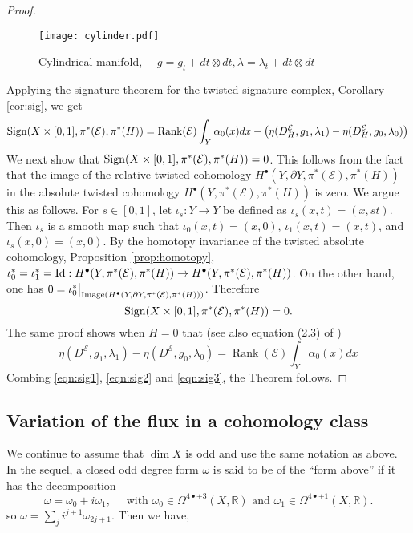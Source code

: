 \documentclass[12pt]{amsart}
\theoremstyle{plain}
\theoremstyle{definition}
\theoremstyle{remark}
\begin{document}
{\begin{proof}
\begin{figure}[h]
\texttt{[image: cylinder.pdf]}\\
\caption{Cylindrical manifold, $\quad g= g_t + dt\otimes dt,  \lambda = \lambda_t + dt\otimes dt$}
\label{fig:box-metric}
\end{figure}

Applying the signature theorem for the twisted signature complex, Corollary \ref{cor:sig}, we get
\begin{equation}\label{eqn:sig1}
{\rm Sign}(X \times [0,1], \pi^*({\mathcal E}), \pi^*(H))={\operatorname{Rank}}({\mathcal E}) \int_Y \alpha_0(x)dx - \left(\eta(D^{\mathcal E}_H, g_1, \lambda_1)
-\eta(D^{\mathcal E}_H, g_0, \lambda_0)\right)\\
\end{equation}
We next {{show}} that ${\rm Sign}(X \times [0,1], \pi^*({\mathcal E}), \pi^*(H))=0$. This follows from the fact that
the image of the relative twisted cohomology $H^\bullet(Y, \partial Y, \pi^*({\mathcal E}), \pi^*(H))$ in the
absolute  twisted cohomology $H^\bullet(Y,  \pi^*({\mathcal E}), \pi^*(H))$ is zero. We argue this as follows. 
For $s\in [0,1]$, let $\iota_s : Y \to Y$ be defined as $\iota_s(x, t) = (x, st)$. Then $\iota_s$ is a smooth map such that $\iota_0(x, t) = (x, 0)$, $\iota_1(x, t)=(x, t)$, and $\iota_s(x, 0)=(x,0)$. By the homotopy invariance 
of the twisted absolute cohomology, Proposition \ref{prop:homotopy}, $\iota_0^* = \iota_1^*= {\rm Id} :  
H^\bullet(Y,  \pi^*({\mathcal E}), \pi^*(H)) \to H^\bullet(Y,  \pi^*({\mathcal E}), \pi^*(H))$. On the other hand, one has
$0 = \iota_0^*\big|_{{\rm Image}(H^\bullet(Y, \partial Y, \pi^*({\mathcal E}), \pi^*(H)))}$. Therefore
\begin{equation}\label{eqn:sig2}
{\rm Sign}(X \times [0,1], \pi^*({\mathcal E}), \pi^*(H))=0.
\end{equation}
The same proof shows when $H=0$ that (see also equation (2.3) of \cite{APS2}) 
\begin{equation}\label{eqn:sig3}
\eta(D^{\mathcal E}, g_1, \lambda_1)
-\eta(D^{\mathcal E}, g_0, \lambda_0) =  {\operatorname{Rank}}({\mathcal E})\int_Y\alpha_0(x)dx
\end{equation}
Combing {{\eqref{eqn:sig1}, \eqref{eqn:sig2} and  \eqref{eqn:sig3}}}, the Theorem follows.
\end{proof}

\subsection{Variation of the flux in a
cohomology class}\label{sect:var-H}
We continue to assume that $\dim X$ is odd and use the same notation as above. {{In the sequel, a closed odd degree form $\omega$  is said to be of the ``form above'' if it has the decomposition 
$$
\omega=\omega_0 + i \omega_1, \quad \text{ with } \omega_0\in \Omega^{4\bullet + 3}(X, {\mathbb{R}}) \text{ and } \omega_1\in \Omega^{4\bullet +1}(X,{\mathbb{R}}).
$$
so $\omega=\sum_j i^{j+1} \omega_{2j+1}$.}}
Then we have,

}
\end{document}

